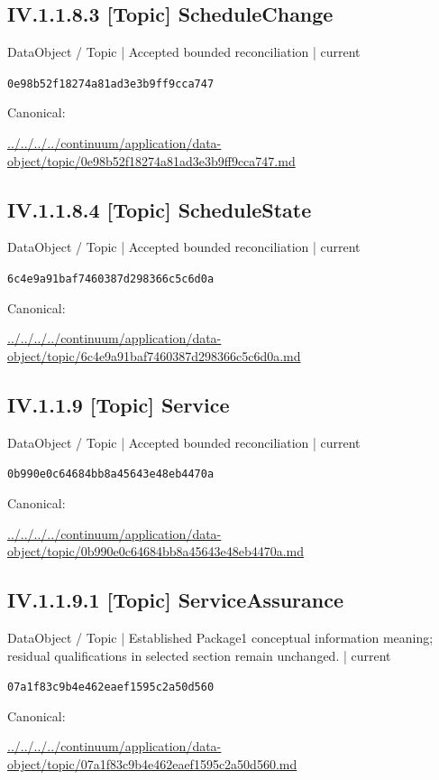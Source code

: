 \documentclass[10pt,a4paper]{article}
\begin{document}
\subsection*{IV.1.1.8.3 [Topic] ScheduleChange}
{\small DataObject / Topic | Accepted bounded reconciliation | current}\par
\texttt{0e98b52f18274a81ad3e3b9ff9cca747}\par
Canonical: \par
{\footnotesize\url{../../../../continuum/application/data-object/topic/0e98b52f18274a81ad3e3b9ff9cca747.md}}\par
\subsection*{IV.1.1.8.4 [Topic] ScheduleState}
{\small DataObject / Topic | Accepted bounded reconciliation | current}\par
\texttt{6c4e9a91baf7460387d298366c5c6d0a}\par
Canonical: \par
{\footnotesize\url{../../../../continuum/application/data-object/topic/6c4e9a91baf7460387d298366c5c6d0a.md}}\par
\subsection*{IV.1.1.9 [Topic] Service}
{\small DataObject / Topic | Accepted bounded reconciliation | current}\par
\texttt{0b990e0c64684bb8a45643e48eb4470a}\par
Canonical: \par
{\footnotesize\url{../../../../continuum/application/data-object/topic/0b990e0c64684bb8a45643e48eb4470a.md}}\par
\subsection*{IV.1.1.9.1 [Topic] ServiceAssurance}
{\small DataObject / Topic | Established Package1 conceptual information meaning; residual qualifications in selected section remain unchanged. | current}\par
\texttt{07a1f83c9b4e462eaef1595c2a50d560}\par
Canonical: \par
{\footnotesize\url{../../../../continuum/application/data-object/topic/07a1f83c9b4e462eaef1595c2a50d560.md}}\par
\end{document}
